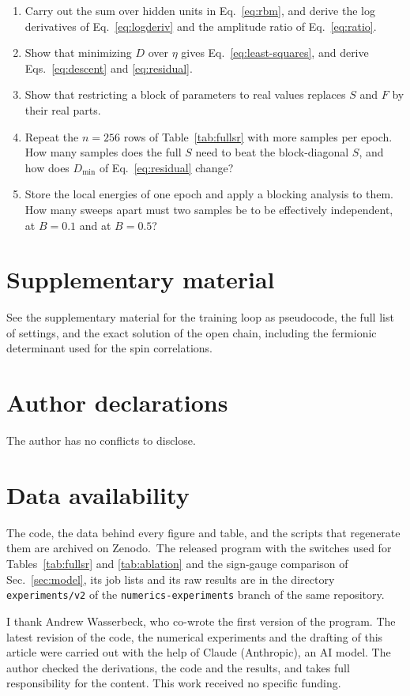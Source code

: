 \documentclass[aps,prb,preprint,amsmath,amssymb,nofootinbib,longbibliography]{revtex4-2}
\begin{document}
\begin{enumerate}
  \item Carry out the sum over hidden units in Eq.~\eqref{eq:rbm}, and derive the log derivatives of
  Eq.~\eqref{eq:logderiv} and the amplitude ratio of Eq.~\eqref{eq:ratio}.
  \item Show that minimizing $D$ over $\eta$ gives Eq.~\eqref{eq:least-squares}, and derive
  Eqs.~\eqref{eq:descent} and \eqref{eq:residual}.
  \item \label{prob:real} Show that restricting a block of parameters to real values replaces $S$ and $F$ by their
  real parts.
  \item Repeat the $n = 256$ rows of Table~\ref{tab:fullsr} with more samples per epoch. How many samples does the
  full $S$ need to beat the block-diagonal $S$, and how does $D_{\min}$ of Eq.~\eqref{eq:residual} change?
  \item Store the local energies of one epoch and apply a blocking analysis to them. How many sweeps apart must two
  samples be to be effectively independent, at $B = 0.1$ and at $B = 0.5$?
\end{enumerate}

\section*{Supplementary material}
See the supplementary material for the training loop as pseudocode, the full list of settings, and the exact solution
of the open chain, including the fermionic determinant used for the spin correlations.

\section*{Author declarations}
The author has no conflicts to disclose.

\section*{Data availability}
The code, the data behind every figure and table, and the scripts that regenerate them are archived on
Zenodo.\codecite\ The released program with the switches used for Tables~\ref{tab:fullsr} and
\ref{tab:ablation} and the sign-gauge comparison of Sec.~\ref{sec:model}, its job lists and its raw results are
in the directory \texttt{experiments/v2} of the \texttt{numerics-experiments} branch of the same repository.

\ifanonymous\else
\begin{acknowledgments}
I thank Andrew Wasserbeck, who co-wrote the first version of the program. The latest revision of the code, the
numerical experiments and the drafting of this article were carried out with the help of Claude (Anthropic), an AI
model. The author checked the derivations, the code and the results, and takes full responsibility for the content.
This work received no specific funding.
\end{acknowledgments}
\fi



\end{document}
